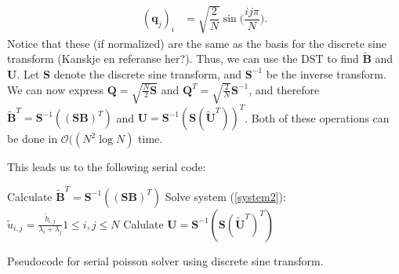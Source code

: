 \begin{align*}
	(\mathbf{q}_j)_i &= \sqrt{\dfrac{2}{N}}\sin \Big( \dfrac{ij\pi}{N}\Big).
\end{align*}
Notice that these (if normalized) are the same as the basis for the discrete sine transform (Kanskje en referanse her?). Thus, we can use the DST to find $\mathbf{\widetilde{B}}$ and $\mathbf{U}$. Let $\mathbf{S}$ denote the discrete sine transform, and $\mathbf{S}^{-1}$ be the inverse transform. We can now express $\mathbf{Q} = \sqrt{\frac{N}{2}\mathbf{S}}$ and $\mathbf{Q}^T = \sqrt{\frac{2}{N}}\mathbf{S}^{-1}$, and therefore $\mathbf{\widetilde{B}}^T = \mathbf{S}^{-1}((\mathbf{SB})^T)$ and $\mathbf{U} = \mathbf{S}^{-1}(\mathbf{S}(\mathbf{\widetilde{U}}^T))^T$. Both of these operations can be done in $\mathcal{O}((N^2\log{N})$ time. 

This leads us to the following serial code:\\

\begin{algorithm}[H]
 Calculate $\mathbf{\widetilde{B}}^T = \mathbf{S}^{-1}((\mathbf{SB})^T)$  \;
 Solve system (\ref{system2}): $\tilde{u}_{i,j} = \frac{\tilde{b}_{i,j}}{\lambda_i + \lambda_j} 1 \leq i, j \leq N$\;
 Calulate $\mathbf{U} = \mathbf{S}^{-1}(\mathbf{S}(\mathbf{\tilde{U}}^T)^T)$ \;
 \caption{Pseudocode for serial poisson solver using discrete sine transform.}
\end{algorithm}